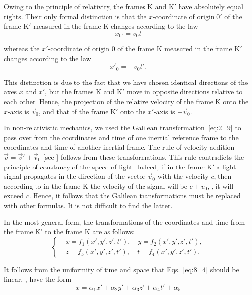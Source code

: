 Owing to the principle of relativity, the frames K and K$'$ have absolutely equal rights. Their only formal distinction is that the $x$-coordinate of origin $0'$ of the frame K$'$ measured in the frame K changes according to the law
\begin{equation}\label{eq:8_2}
	x_{0'} = v_0 t
\end{equation}

\noindent
whereas the $x'$-coordinate of origin $0$ of the frame K measured in the frame K$'$ changes according to the law
\begin{equation}\label{eq:8_3}
	x'_0 = - v_0 t'.
\end{equation}

\noindent
This distinction is due to the fact that we have chosen identical directions of the axes $x$ and $x'$, but the frames K and K$'$ move in opposite directions relative to each other. Hence, the projection of the relative velocity of the frame K onto the $x$-axis is $\vec{v}_0$, and that of the frame K$'$ onto the $x'$-axis is $-\vec{v}_0$.

In non-relativistic mechanics, we used the Galilean transformation~\eqref{eq:2_9} to pass over from the coordinates and time of one inertial reference frame to the coordinates and time of another inertial frame. The rule of velocity addition $\vec{v}=\vec{v}'+\vec{v}_0$ [see ] follows from these transformations. This rule contradicts the principle of constancy of the speed of light. Indeed, if in the frame K$'$ a light signal propagates in the direction of the vector $\vec{v}_0$ with the velocity $c$, then according to  in the frame K the velocity of the signal will be $c+v_0$, \ie, it will exceed $c$. Hence, it follows that the Galilean transformations must be replaced with other formulas. It is not difficult to find the latter.

In the most general form, the transformations of the coordinates and time from the frame K$'$ to the frame K are as follows:
\begin{equation}\label{eq:8_4}
	\begin{cases}
		&\!\!\!\! x = f_1(x',y',z',t'),\quad y = f_2(x',y',z',t'),\\
		&\!\!\!\! z = f_3(x',y',z',t'),\quad t = f_4(x',y',z',t').
	\end{cases}
\end{equation}

\noindent
It follows from the uniformity of time and space that Eqs.~\eqref{eq:8_4} should be linear, \ie, have the form
\begin{equation}\label{eq:8_5}
	x = \alpha_1 x' + \alpha_2 y' + \alpha_3 z' + \alpha_4 t' + \alpha_5
\end{equation}

